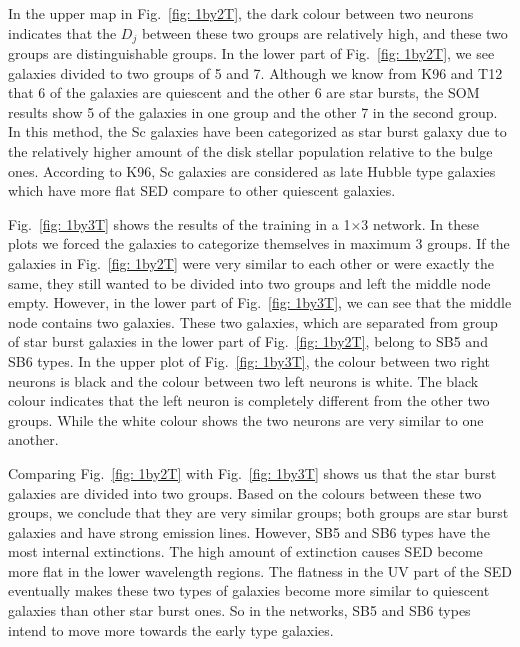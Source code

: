         
            In the upper map in Fig.~\ref{fig: 1by2T}, the dark colour between two neurons indicates that the $D_j$ between these two groups are relatively high, and these two groups are distinguishable groups. 
            In the lower part of Fig.~\ref{fig: 1by2T}, we see galaxies divided to two groups of 5 and 7.
            Although we know from K96 and T12 that 6 of the galaxies are quiescent and the other 6 are star bursts, the SOM results show 5 of the galaxies in one group and the other 7 in the second group.
            In this method, the Sc galaxies have been categorized as star burst galaxy due to the relatively higher amount of the disk stellar population relative to the bulge ones. 
            According to K96, Sc galaxies are considered as late Hubble type galaxies which have more flat SED compare to other quiescent galaxies. 
            

            Fig.~\ref{fig: 1by3T} shows the results of the training in a 1$\times$3 network.
            In these plots we forced the galaxies to categorize themselves in maximum 3 groups. 
            If the galaxies in Fig.~\ref{fig: 1by2T} were very similar to each other or were exactly the same, they still wanted to be divided into two groups and left the middle node empty. 
            However, in the lower part of Fig.~\ref{fig: 1by3T}, we can see that the middle node contains two galaxies.
            These two galaxies, which are separated from group of star burst galaxies in the lower part of Fig.~\ref{fig: 1by2T}, belong to SB5 and SB6 types.
            In the upper plot of Fig.~\ref{fig: 1by3T}, the colour between two right neurons is black and the colour between two left neurons is white. 
            The black colour indicates that the left neuron is completely different from the other two groups.
            While the white colour shows the two neurons are very similar to one another. 
            
            Comparing Fig.~\ref{fig: 1by2T} with Fig.~\ref{fig: 1by3T} shows us that the star burst galaxies are divided into two groups. 
            Based on the colours between these two groups, we conclude that they are very similar groups; both groups are star burst galaxies and have strong emission lines.
            However, SB5 and SB6 types have the most internal extinctions.
            The high amount of extinction causes SED become more flat in the lower wavelength regions.
            The flatness in the UV part of the SED eventually makes these two types of galaxies become more similar to quiescent galaxies than other star burst ones.
            So in the networks, SB5 and SB6 types intend to move more towards the early type galaxies.
                

